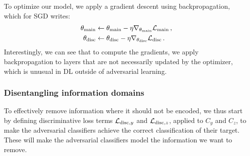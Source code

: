 To optimize our model, we apply a gradient descent using backpropagation, which for \acs{SGD} writes:
\begin{align}
    \theta_\mathrm{main} &\leftarrow \theta_\mathrm{main} - \eta \nabla_{\theta_\mathrm{main}} \mathcal{L}_\mathrm{main}\,, \\
    \theta_\mathrm{disc} &\leftarrow \theta_\mathrm{disc} - \eta \nabla_{\theta_\mathrm{disc}} \mathcal{L}_\mathrm{disc}\,.
\end{align}
Interestingly, we can see that to compute the gradients, we apply backpropagation to layers that are not necessarily updated by the optimizer, which is unusual in \ac{DL} outside of adversarial learning.

\subsubsection{Disentangling information domains}

To effectively remove information where it should not be encoded, we thus start by defining discriminative loss terms $\mathcal{L}_{\textrm{disc},y}$ and $\mathcal{L}_{\textrm{disc},z}$, applied to $C_y$ and $C_z$, to make the adversarial classifiers achieve the correct classification of their target. These will make the adversarial classifiers model the information we want to remove.


